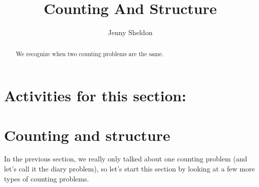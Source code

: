 \documentclass{ximera}
\title{Counting And Structure}
\author{Jenny Sheldon}
\begin{document}
\begin{abstract}
We recognize when two counting problems are the same.
\end{abstract}
\maketitle

\section{Activities for this section:} 

\section{Counting and structure}

In the previous section, we really only talked about one counting problem (and let's call it the diary problem), so let's start this section by looking at a few more types of counting problems.
\end{document}
